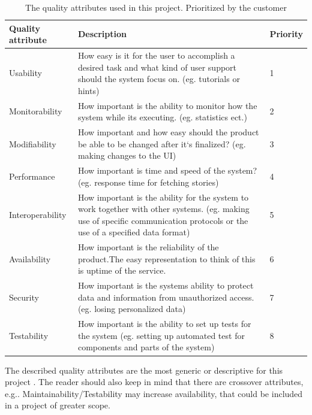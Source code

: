 \begin{table}[h]
	\small
	\centering
	\caption[Quality attributes]{The quality attributes used in this project. Prioritized by the customer} 
	\begin{tabular}{ | p{2.9cm} | p{11.5cm} | p{1.4cm} | }	
		\hline {\bf Quality \newline attribute} & {\bf Description} & {\bf Priority} \\ \hline
		
		Usability & How easy is it for the user to accomplish a desired task and what kind of user support should the system focus on. (eg. tutorials or hints) & 1 \\\hline
		
		Monitorability & How important is the ability to monitor how the system while its executing. (eg. statistics ect.) & 2 \\\hline		
		
		Modifiability & How important and how easy should the product be able to be changed after it`s finalized? (eg. making changes to the UI) & 3\\\hline
		
		Performance & How important is time and speed of the system? (eg. response time for fetching stories) & 4\\\hline
		
		Interoperability & How important is the ability for the system to work together with other systems. (eg. making use of specific communication protocols or the use of a specified data format) & 5	\\\hline
		
		Availability & How important is the reliability of the product.The easy representation to think of this is uptime of the service. & 6 \\\hline
		
		Security & How important is the systems ability to protect data and information from unauthorized access. (eg. losing personalized data) & 7 \\\hline
		
		Testability & How important is the ability to set up tests for the system (eg. setting up automated test for components and parts of the system) & 8 \\\hline	
	\end{tabular}
	\label{Tab:quality_attributes}
\end{table}

The described quality attributes are the most generic or descriptive for this project . The reader should also keep in mind that there are crossover attributes, e.g.. Maintainability/Testability may increase availability, that could be included in a project of greater scope.\newline

